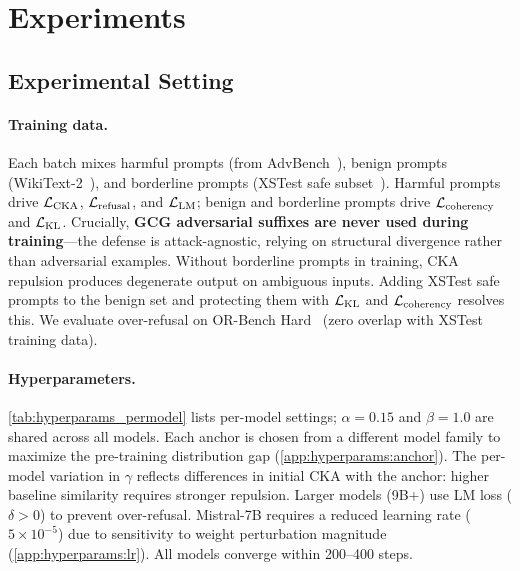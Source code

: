 \section{Experiments}

\subsection{Experimental Setting}

\paragraph{Training data.}
Each batch mixes harmful prompts (from AdvBench~\citep{zou2023universal}), benign prompts (WikiText-2~\citep{wikitext}), and borderline prompts (XSTest safe subset~\citep{xstest}). Harmful prompts drive $\mathcal{L}_{\text{CKA}}$, $\mathcal{L}_{\text{refusal}}$, and $\mathcal{L}_{\text{LM}}$; benign and borderline prompts drive $\mathcal{L}_{\text{coherency}}$ and $\mathcal{L}_{\text{KL}}$. Crucially, \textbf{GCG adversarial suffixes are never used during training}---the defense is attack-agnostic, relying on structural divergence rather than adversarial examples.
Without borderline prompts in training, CKA repulsion produces degenerate output on ambiguous inputs. Adding XSTest safe prompts to the benign set and protecting them with $\mathcal{L}_{\text{KL}}$ and $\mathcal{L}_{\text{coherency}}$ resolves this. We evaluate over-refusal on OR-Bench Hard~\citep{orbench} (zero overlap with XSTest training data).

\paragraph{Hyperparameters.}
\cref{tab:hyperparams_permodel} lists per-model settings; $\alpha\!=\!0.15$ and $\beta\!=\!1.0$ are shared across all models. Each anchor is chosen from a different model family to maximize the pre-training distribution gap (\cref{app:hyperparams:anchor}). The per-model variation in $\gamma$ reflects differences in initial CKA with the anchor: higher baseline similarity requires stronger repulsion. Larger models (9B+) use LM loss ($\delta > 0$) to prevent over-refusal. Mistral-7B requires a reduced learning rate ($5\!\times\!10^{-5}$) due to sensitivity to weight perturbation magnitude (\cref{app:hyperparams:lr}). All models converge within 200--400 steps.

